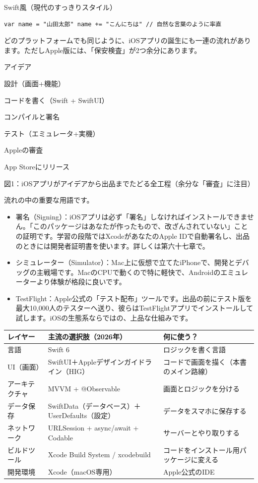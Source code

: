 Swift風（現代のすっきりスタイル）

\begin{lstlisting}
var name = "山田太郎" name += "こんにちは" // 自然な言葉のように率直
\end{lstlisting}


どのプラットフォームでも同じように、iOSアプリの誕生にも一連の流れがあります。ただしApple版には、「保安検査」が2つ余分にあります。

アイデア

設計（画面+機能）

コードを書く（Swift + SwiftUI）

コンパイルと署名

テスト（エミュレータ+実機）

Appleの審査

App Storeにリリース

\begin{center}\small\color{gray}図1：iOSアプリがアイデアから出品までたどる全工程（余分な「審査」に注目）\end{center}

流れの中の重要な用語です。

\begin{itemize}
  \item 署名（Signing）：iOSアプリは必ず「署名」しなければインストールできません。「このパッケージはあなたが作ったもので、改ざんされていない」ことの証明です。学習の段階ではXcodeがあなたのApple IDで自動署名し、出品のときには開発者証明書を使います。詳しくは第六十七章で。
  \item シミュレーター（Simulator）：Mac上に仮想で立てたiPhoneで、開発とデバッグの主戦場です。MacのCPUで動くので特に軽快で、Androidのエミュレーターより体験が格段に良いです。
  \item TestFlight：Apple公式の「テスト配布」ツールです。出品の前にテスト版を最大10,000人のテスターへ送り、彼らはTestFlightアプリでインストールして試します。iOSの生態系ならではの、上品な仕組みです。
\end{itemize}


\begin{center}
\begin{tabularx}{\linewidth}{|X|X|X|}
\hline
\textbf{レイヤー} & \textbf{主流の選択肢（2026年）} & \textbf{何に使う？} \tabularnewline
\hline
言語 & Swift 6 & ロジックを書く言語 \tabularnewline
UI（画面） & SwiftUI＋Appleデザインガイドライン（HIG） & コードで画面を描く（本書のメイン路線） \tabularnewline
アーキテクチャ & MVVM + @Observable & 画面とロジックを分ける \tabularnewline
データ保存 & SwiftData（データベース）＋UserDefaults（設定） & データをスマホに保存する \tabularnewline
ネットワーク & URLSession + async/await + Codable & サーバーとやり取りする \tabularnewline
ビルドツール & Xcode Build System / xcodebuild & コードをインストール用パッケージに変える \tabularnewline
開発環境 & Xcode（macOS専用） & Apple公式のIDE \tabularnewline
\hline
\end{tabularx}
\end{center}

